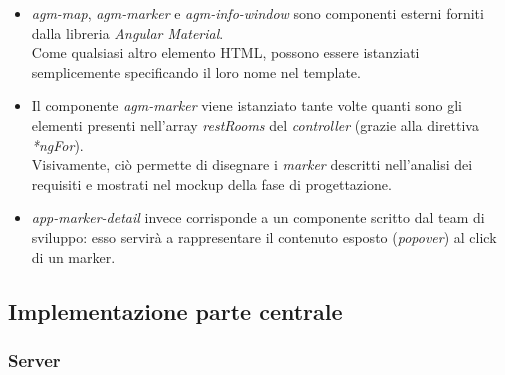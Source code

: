 \documentclass[12pt]{article}
\begin{document}
\begin{itemize}
	\item \textit{agm-map}, \textit{agm-marker} e \textit{agm-info-window} sono componenti esterni forniti dalla libreria \textit{Angular Material}.\\ Come qualsiasi altro elemento HTML, possono essere  istanziati semplicemente specificando il loro nome nel template. 
	\item Il componente \textit{agm-marker} viene istanziato tante volte quanti sono gli elementi presenti nell'array \textit{restRooms} del \textit{controller} (grazie alla direttiva \textit{*ngFor}).\\ Visivamente, ciò permette di disegnare i \textit{marker} descritti nell'analisi dei requisiti e mostrati nel mockup della fase di progettazione.
	\item \textit{app-marker-detail} invece corrisponde a un componente scritto dal team di sviluppo: esso servirà a rappresentare il contenuto esposto (\textit{popover}) al click di un marker.
\end{itemize}
\newpage
\subsection{Implementazione parte centrale}
\subsubsection{Server}
\end{document}
